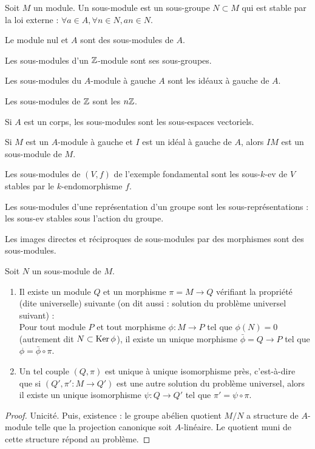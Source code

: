 \begin{definition}
Soit $M$ un module. Un sous-module est un sous-groupe $N \subset M$ qui est stable par la loi externe : $\forall a\in A, \forall n\in N, an\in N$.
\end{definition}



\begin{exemple}
Le module nul et $A$ sont des sous-modules de $A$.

Les sous-modules d'un $\mathbb{Z}$-module sont ses sous-groupes.

Les sous-modules du $A$-module à gauche $A$ sont les idéaux à gauche de $A$.

Les sous-modules de $\mathbb{Z}$ sont les $n\mathbb{Z}$.

Si $A$ est un corps, les sous-modules sont les sous-espaces vectoriels.

Si $M$ est un $A$-module à gauche et $I$ est un idéal à gauche de $A$, alors $IM$ est un sous-module de $M$.
\end{exemple}

\begin{exemple}
Les sous-modules de $(V,f)$ de l'exemple fondamental sont les sous-$k$-ev de $V$ stables par le $k$-endomorphisme $f$.
\end{exemple}

\begin{exemple}
Les sous-modules d'une représentation d'un groupe sont les sous-représentations : les sous-ev stables sous l'action du groupe.
\end{exemple}

\begin{proposition}
Les images directes et réciproques de sous-modules par des morphismes sont des sous-modules.
\end{proposition}


\begin{propdef}[Quotients]
Soit $N$ un sous-module de $M$. 
\begin{enumerate}
\item Il existe un module $Q$ et un morphisme $\pi = M \to Q$ vérifiant la propriété (dite universelle) suivante (on dit aussi : \og solution du problème universel suivant\fg) :\\
Pour tout module $P$ et tout morphisme $\phi : M \to P$ tel que $\phi(N)={0}$ (autrement dit $N \subset \operatorname{Ker} \phi$), il existe un unique morphisme $\bar \phi = Q \to P$ tel que $\phi  = \bar \phi \circ \pi$.
\item Un tel couple $(Q,\pi)$ est unique à unique isomorphisme près, c'est-à-dire que si $(Q', \pi' :M \to Q')$ est une autre solution du problème universel, alors il existe un unique isomorphisme $\psi : Q\to Q'$ tel que $\pi'=\psi\circ\pi$.
\end{enumerate}
\end{propdef}
\begin{proof} Unicité. Puis, existence : le groupe abélien quotient $M/N$ a structure de $A$-module telle que la projection canonique soit $A$-linéaire. Le quotient muni de cette structure répond au problème.
\end{proof}

